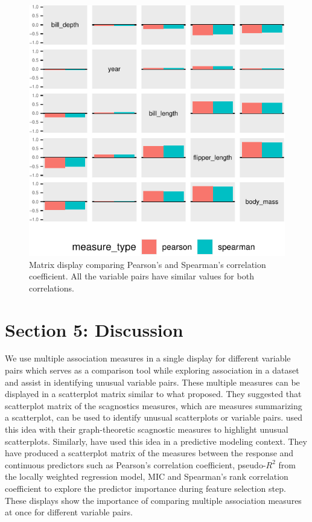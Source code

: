 \begin{Schunk}
\begin{figure}

{\centering \includegraphics{rj_paper_files/figure-latex/compare-matrix-1} 

}

\caption[Matrix display comparing Pearson's and Spearman's correlation coefficient]{Matrix display comparing Pearson's and Spearman's correlation coefficient. All the variable pairs have similar values for both correlations.}\label{fig:compare-matrix}
\end{figure}
\end{Schunk}

\hypertarget{section-5-discussion}{%
\section{Section 5: Discussion}\label{section-5-discussion}}

We use multiple association measures in a single display for different
variable pairs which serves as a comparison tool while exploring
association in a dataset and assist in identifying unusual variable
pairs. These multiple measures can be displayed in a scatterplot matrix
similar to what \citet{tukey1985computer} proposed. They suggested that
scatterplot matrix of the scagnostics measures, which are measures
summarizing a scatterplot, can be used to identify unusual scatterplots
or variable pairs. \citet{wilkinson2005graph} used this idea with their
graph-theoretic scagnostic measures to highlight unusual scatterplots.
Similarly, \citet{kuhn2013applied} have used this idea in a predictive
modeling context. They have produced a scatterplot matrix of the
measures between the response and continuous predictors such as
Pearson's correlation coefficient, pseudo-\(R^2\) from the locally
weighted regression model, MIC and Spearman's rank correlation
coefficient to explore the predictor importance during feature selection
step. These displays show the importance of comparing multiple
association measures at once for different variable pairs.

